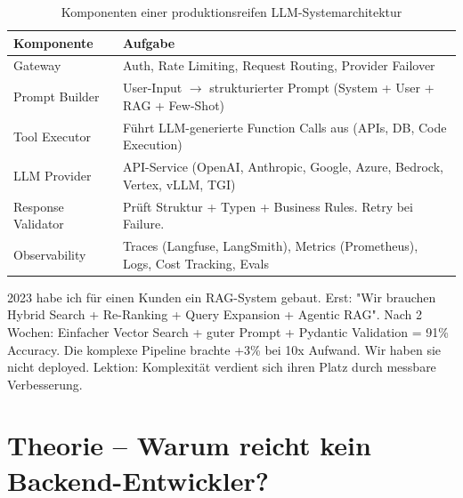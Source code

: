 \begin{table}[H]
\centering
\begin{tabularx}{\linewidth}{lX}
\toprule
\textbf{Komponente} & \textbf{Aufgabe} \\
\midrule
Gateway & Auth, Rate Limiting, Request Routing, Provider Failover \\
Prompt Builder & User-Input $\rightarrow$ strukturierter Prompt (System + User + RAG + Few-Shot) \\
Tool Executor & Führt LLM-generierte Function Calls aus (APIs, DB, Code Execution) \\
LLM Provider & API-Service (OpenAI, Anthropic, Google, Azure, Bedrock, Vertex, vLLM, TGI) \\
Response Validator & Prüft Struktur + Typen + Business Rules. Retry bei Failure. \\
Observability & Traces (Langfuse, LangSmith), Metrics (Prometheus), Logs, Cost Tracking, Evals \\
\bottomrule
\end{tabularx}
\caption{Komponenten einer produktionsreifen LLM-Systemarchitektur}
\label{tab:komponenten}
\end{table}





\par\mbox{}\par
\begin{AUTORnotizEnv}
2023 habe ich für einen Kunden ein RAG-System gebaut. Erst: "Wir brauchen Hybrid Search + Re-Ranking + Query Expansion + Agentic RAG".
Nach 2 Wochen: Einfacher Vector Search + guter Prompt + Pydantic Validation = 91\% Accuracy.
Die komplexe Pipeline brachte +3\% bei 10x Aufwand. Wir haben sie nicht deployed.
Lektion: Komplexität verdient sich ihren Platz durch messbare Verbesserung.
\end{AUTORnotizEnv}

\section{Theorie -- Warum reicht kein Backend-Entwickler?}

